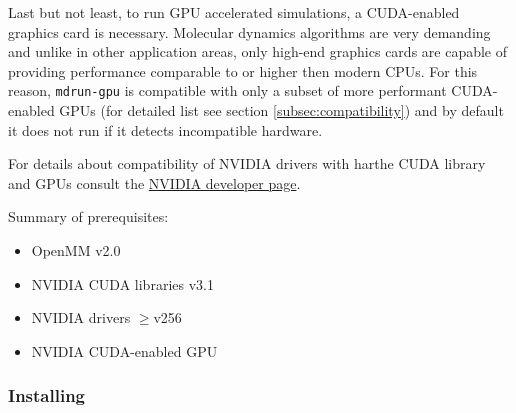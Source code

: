 Last but not least, to run GPU accelerated simulations, a CUDA-enabled 
graphics card is necessary. Molecular dynamics algorithms 
are very demanding and unlike in other application areas, 
only high-end graphics cards are capable of providing performance comparable 
to or higher then modern CPUs. For this reason, {\tt mdrun-gpu} is compatible with 
only a subset of more performant CUDA-enabled GPUs (for detailed list see section 
\ref{subsec:compatibility}) and by default it does not run if it detects
incompatible hardware. 

For details about compatibility of NVIDIA drivers with harthe CUDA library and GPUs consult  
the \href{http://developer.nvidia.com/object/gpucomputing.html}{NVIDIA developer page}.

Summary of prerequisites: 
\begin{itemize}
    \item OpenMM v2.0
    \item NVIDIA CUDA libraries v3.1
    \item NVIDIA drivers $\geq$v256
    \item NVIDIA CUDA-enabled GPU
\end{itemize}


\subsubsection{Installing}

